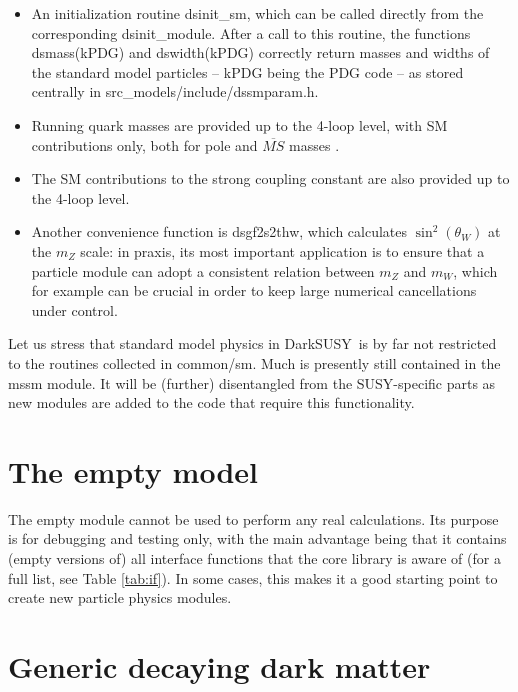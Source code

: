 \documentclass[a4paper,10pt,oneside]{book}
\newcommand{\code}[1]{\ft{#1}}
\newcommand{\ds}{{\sffamily DarkSUSY}}
\newcommand{\ft}[1]{\textsf{#1}}
\begin{document}
\begin{itemize}
\item An initialization routine \code{dsinit\_sm}, which can be called directly from the corresponding 
        \code{dsinit\_module}. After a call to this routine, the functions \code{dsmass(kPDG)} and 
        \code{dswidth(kPDG)} correctly return masses and widths of the standard model particles 
        -- \code{kPDG} being the PDG code  \cite{Groom:2000in} -- as stored centrally in 
        \code{src\_models/include/dssmparam.h}.
\item Running quark masses are provided up to the 4-loop level, with SM contributions only, 
         both for pole and $\overline{MS}$ masses \cite{Chetyrkin:2000yt}.
\item The SM contributions to the strong coupling constant are also provided up to the 4-loop level.
 \item Another convenience function is \code{dsgf2s2thw}, which calculates $\sin^2(\theta_W)$ at the 
         $m_Z$ scale: in praxis, its most important application is to ensure that a particle module can adopt a 
         consistent relation between $m_Z$ and $m_W$, which for example can be crucial in order to 
         keep large numerical cancellations under control.
\end{itemize}

Let us stress that standard model physics in \ds\  is by far not restricted to the 
routines collected in \code{common/sm}. Much is presently still contained in the \code{mssm} module.
It will be (further) disentangled from the SUSY-specific parts as new modules are added to the code that
require this functionality. 


\chapter{The empty model}

The empty module cannot be used to perform any real calculations. Its purpose is for debugging
and testing only, with the main advantage being that it contains (empty versions of) all interface 
functions that the core library is aware of (for a full list, see Table \ref{tab:if}). In some cases, this 
makes it a good starting point to create new particle physics modules.
\chapter{Generic decaying dark matter}
\label{ch:decay}
\end{document}
